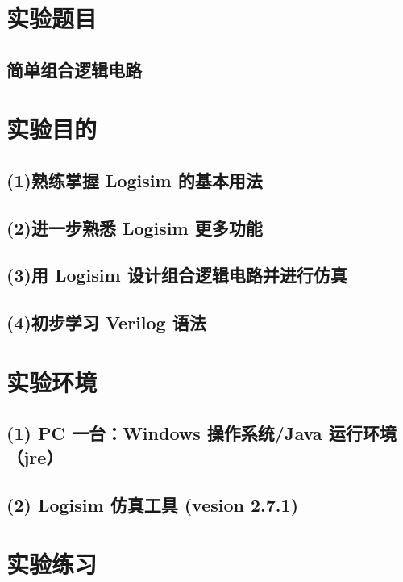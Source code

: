 \documentclass{article}
\begin{document}
    \section{实验题目}
        \subsection*{\qquad 简单组合逻辑电路}

    \section{实验目的}
        \subsection*{\qquad (1)熟练掌握 Logisim 的基本用法}
        \subsection*{\qquad (2)进一步熟悉 Logisim 更多功能}
        \subsection*{\qquad (3)用 Logisim 设计组合逻辑电路并进行仿真}
        \subsection*{\qquad (4)初步学习 Verilog 语法}
    
    \section{实验环境}
        \subsection*{\qquad (1) PC 一台：Windows 操作系统/Java 运行环境（jre）}
        \subsection*{\qquad (2) Logisim 仿真工具 (vesion 2.7.1)}
    \clearpage
    \section{实验练习}
\end{document}
